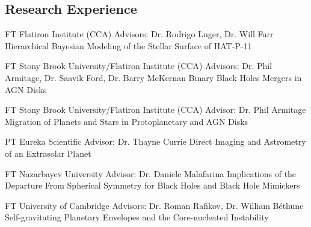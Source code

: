 \documentclass[10pt]{article} %
\begin{document}
\begin{paracol}{1}
\section{Research Experience}




{FT} %
{Flatiron Institute (CCA)} %
{Advisors: Dr. Rodrigo Luger, Dr. Will Farr} %
{Hierarchical Bayesian Modeling of the Stellar Surface of HAT-P-11} %

{FT} %
{Stony Brook University/Flatiron Institute (CCA)} %
{Advisors: Dr. Phil Armitage, Dr. Saavik Ford, Dr. Barry McKernan} %
{Binary Black Holes Mergers in AGN Disks} %

{FT} %
{Stony Brook University/Flatiron Institute (CCA)} %
{Advisor: Dr. Phil Armitage} %
{Migration of Planets and Stars in Protoplanetary and AGN Disks} %

{PT} %
{Eureka Scientific} %
{Advisor: Dr. Thayne Currie} %
{Direct Imaging and Astrometry of an Extrasolar Planet} %

{FT} %
{Nazarbayev University} %
{Advisor: Dr. Daniele Malafarina} %
{Implications of the Departure From Spherical Symmetry for Black Holes and Black Hole Mimickers}  %


{FT} %
{University of Cambridge} %
{Advisors: Dr. Roman Rafikov, Dr. William B\'ethune} %
{Self-gravitating Planetary Envelopes and the Core-nucleated Instability} %


\end{paracol}
\end{document}
